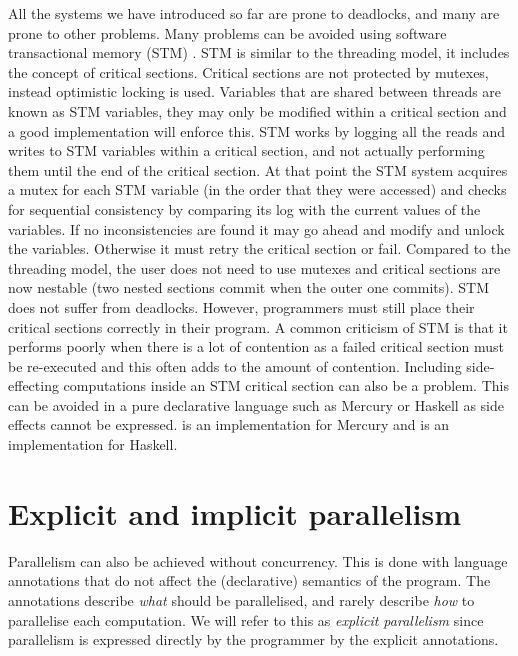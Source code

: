All the systems we have introduced so far are prone to deadlocks,
and many are prone to other problems.
Many problems can be avoided using software transactional memory (STM)
\citep{stm}.
STM is similar to the threading model, it includes the concept of critical
sections.
Critical sections are not protected by mutexes,
instead optimistic locking is used.
Variables that are shared between threads are known as STM variables,
they may only be modified within a critical section and a good implementation
will enforce this.
STM works by logging all the reads and writes to STM variables within a
critical section, and not actually performing them until the end of the
critical section.
At that point the STM system acquires a mutex for each STM variable (in the
order that they were accessed)
and checks for sequential consistency by comparing its log with the current
values of the variables.
If no inconsistencies are found
it may go ahead and modify and unlock the variables.
Otherwise it must retry the critical section or fail.
Compared to the threading model,
the user does not need to use mutexes and critical sections are now
nestable (two nested sections commit when the outer one commits).
STM does not suffer from deadlocks.
However, programmers must still place their critical sections correctly in
their program.
A common criticism of STM is that it performs poorly when there is a lot of
contention as a failed critical section must be re-executed and this often
adds to the amount of contention.
Including side-effecting computations inside an STM critical section can also
be a problem.
This can be avoided in a pure declarative language such as
Mercury \citep{mercury_jlp} or Haskell \citep{haskell98} as side effects cannot
be expressed.
\citet{mika:mercury-stm} is an implementation for Mercury
and \citet{harris:2005:haskell-stm} is an implementation for Haskell.

\section{Explicit and implicit parallelism}
\label{sec:intro_par}

Parallelism can also be achieved without concurrency.
This is done with language annotations that do not affect the (declarative)
semantics of the program.
The annotations describe \emph{what} should be parallelised,
and rarely describe \emph{how} to parallelise each computation.
We will refer to this as \emph{explicit parallelism}
since parallelism is expressed directly by the programmer by the explicit
annotations.

